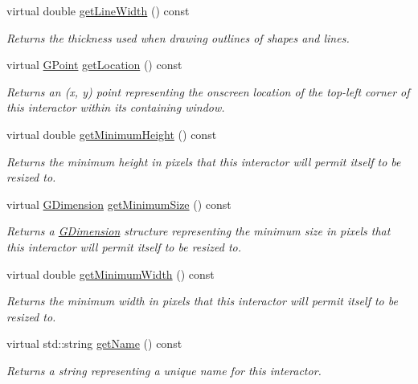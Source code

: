 \begin{DoxyCompactItemize}
virtual double \mbox{\hyperlink{classGDrawingSurface_a85ff266dc3eb63d9f2d8e5a4487fd3c0}{get\+Line\+Width}} () const
\begin{DoxyCompactList}\small\item\em Returns the thickness used when drawing outlines of shapes and lines. \end{DoxyCompactList}\item 
virtual \mbox{\hyperlink{classGPoint}{G\+Point}} \mbox{\hyperlink{classGInteractor_a4f83802015511edeb63b892830812c11}{get\+Location}} () const
\begin{DoxyCompactList}\small\item\em Returns an (x, y) point representing the onscreen location of the top-\/left corner of this interactor within its containing window. \end{DoxyCompactList}\item 
virtual double \mbox{\hyperlink{classGInteractor_aed4b0075fcc434499c3cb3e46896bda3}{get\+Minimum\+Height}} () const
\begin{DoxyCompactList}\small\item\em Returns the minimum height in pixels that this interactor will permit itself to be resized to. \end{DoxyCompactList}\item 
virtual \mbox{\hyperlink{classGDimension}{G\+Dimension}} \mbox{\hyperlink{classGInteractor_a66b5af0b32493b4d597ca0a3df2049ea}{get\+Minimum\+Size}} () const
\begin{DoxyCompactList}\small\item\em Returns a \mbox{\hyperlink{classGDimension}{G\+Dimension}} structure representing the minimum size in pixels that this interactor will permit itself to be resized to. \end{DoxyCompactList}\item 
virtual double \mbox{\hyperlink{classGInteractor_a59e668114fe3d49d2a0f28deb258f7c8}{get\+Minimum\+Width}} () const
\begin{DoxyCompactList}\small\item\em Returns the minimum width in pixels that this interactor will permit itself to be resized to. \end{DoxyCompactList}\item 
virtual std\+::string \mbox{\hyperlink{classGInteractor_a8a60438a5b55d0b2ceb35c8674b9d8c5}{get\+Name}} () const
\begin{DoxyCompactList}\small\item\em Returns a string representing a unique name for this interactor. \end{DoxyCompactList}\item 

\end{DoxyCompactItemize}
